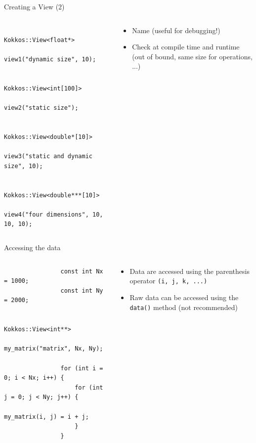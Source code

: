 \documentclass[
    aspectratio=169,
    handout,
]{beamer}
\begin{document}
\begin{frame}[fragile]{Creating a View (2)}
    \begin{columns}
        \begin{column}{0.6\linewidth}
            \begin{verbatim}
                Kokkos::View<float*>
                    view1("dynamic size", 10);

                Kokkos::View<int[100]>
                    view2("static size");

                Kokkos::View<double*[10]>
                    view3("static and dynamic size", 10);

                Kokkos::View<double***[10]>
                    view4("four dimensions", 10, 10, 10);
            \end{verbatim}
        \end{column}
        \begin{column}{0.4\linewidth}
            \begin{itemize}
                \item Name (useful for debugging!)
                \item Check at compile time and runtime (out of bound, same size for operations, ...)
            \end{itemize}
        \end{column}
    \end{columns}
\end{frame}


\begin{frame}[fragile]{Accessing the data}
    \begin{columns}
        \begin{column}{0.6\linewidth}
            \begin{verbatim}
                const int Nx = 1000;
                const int Ny = 2000;

                Kokkos::View<int**>
                    my_matrix("matrix", Nx, Ny);

                for (int i = 0; i < Nx; i++) {
                    for (int j = 0; j < Ny; j++) {
                        my_matrix(i, j) = i + j;
                    }
                }
            \end{verbatim}
        \end{column}
        \begin{column}{0.4\linewidth}
            \begin{itemize}
                \item Data are accessed using the parenthesis operator \texttt{(i, j, k, ...)}
                \item Raw data can be accessed using the \texttt{data()} method (not recommended)
            \end{itemize}
        \end{column}
    \end{columns}
\end{frame}
\end{document}
